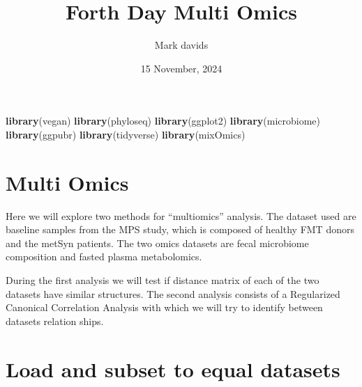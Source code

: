 \documentclass[
]{article}
\title{Forth Day Multi Omics}
\author{Mark davids}
\date{15 November, 2024}
\newenvironment{Shaded}{\begin{snugshade}}{\end{snugshade}}
\newcommand{\FloatTok}[1]{\textcolor[rgb]{0.00,0.00,0.81}{#1}}
\newcommand{\FunctionTok}[1]{\textcolor[rgb]{0.13,0.29,0.53}{\textbf{#1}}}
\newcommand{\NormalTok}[1]{#1}
\newcommand{\OtherTok}[1]{\textcolor[rgb]{0.56,0.35,0.01}{#1}}
\newcommand{\SpecialCharTok}[1]{\textcolor[rgb]{0.81,0.36,0.00}{\textbf{#1}}}
\newcommand{\StringTok}[1]{\textcolor[rgb]{0.31,0.60,0.02}{#1}}
\begin{document}
\maketitle

\begin{Shaded}
\begin{Highlighting}[]
\FunctionTok{library}\NormalTok{(vegan)}
\FunctionTok{library}\NormalTok{(phyloseq)}
\FunctionTok{library}\NormalTok{(ggplot2)}
\FunctionTok{library}\NormalTok{(microbiome)}
\FunctionTok{library}\NormalTok{(ggpubr)}
\FunctionTok{library}\NormalTok{(tidyverse)}
\FunctionTok{library}\NormalTok{(mixOmics)}
\end{Highlighting}
\end{Shaded}

\hypertarget{multi-omics}{%
\section{Multi Omics}\label{multi-omics}}

Here we will explore two methods for ``multiomics'' analysis. The
dataset used are baseline samples from the MPS study, which is composed
of healthy FMT donors and the metSyn patients. The two omics datasets
are fecal microbiome composition and fasted plasma metabolomics.

During the first analysis we will test if distance matrix of each of the
two datasets have similar structures. The second analysis consists of a
Regularized Canonical Correlation Analysis with which we will try to
identify between datasets relation ships.

\hypertarget{load-and-subset-to-equal-datasets}{%
\section{Load and subset to equal
datasets}\label{load-and-subset-to-equal-datasets}}

\begin{Shaded}
\end{Shaded}
\end{document}
